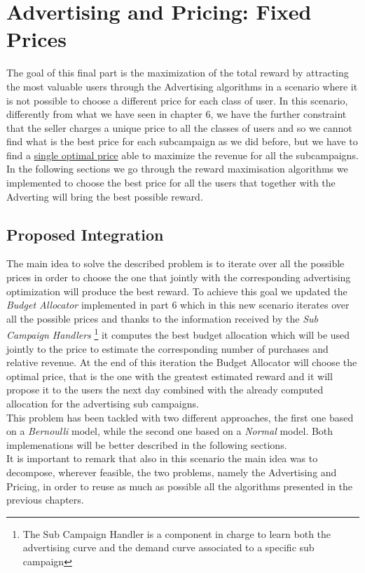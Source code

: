 \chapter{Advertising and Pricing: Fixed Prices}

The goal of this final part is the maximization of the total reward by attracting the most valuable users through the Advertising algorithms in a scenario where it is not possible to choose a different price for each class of user. In this scenario, differently from what we have seen in chapter 6, we have the further constraint that the seller charges a unique price to all the classes of users and so we cannot find what is the best price for each subcampaign as we did before, but we have to find a \underline{single optimal price} able to maximize the revenue for all the subcampaigns.\\ In the following sections we go through the reward maximisation algorithms we implemented to choose the best price for all the users that together with the Adverting will bring the best possible reward.


\section{Proposed Integration}
The main idea to solve the described problem is to iterate over all the possible prices in order to choose the one that jointly with the corresponding advertising optimization will produce the best reward.
To achieve this goal we updated the \textit{Budget Allocator} implemented in part 6 which in this new scenario iterates over all the possible prices and thanks to the information received by the \textit{Sub Campaign Handlers} \footnote{The Sub Campaign Handler is a component in charge to learn both the advertising curve and the demand curve associated to a specific sub campaign} it computes the best budget allocation which will be used jointly to the price to estimate the corresponding number of purchases and relative revenue. At the end of this iteration the Budget Allocator will choose the optimal price, that is the one with the greatest estimated reward and it will propose it to the users the next day combined with the already computed allocation for the advertising sub campaigns.\\ This problem has been tackled with two different approaches, the first one based on a \textit{Bernoulli} model, while the second one based on a \textit{Normal} model. Both implemenations will be better described in the following sections. \\It is important to remark that also in this scenario the main idea was to decompose, wherever feasible, the two problems, namely the Advertising and Pricing, in order to reuse as much as possible all the algorithms presented in the previous chapters.


